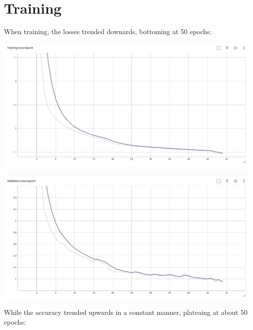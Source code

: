 \documentclass[conference]{IEEEtran}
\begin{document}
\section{Training}
When training, the losses trended downards, bottoming at 50 epochs:

\begin{center}
    \begin{minipage}{0.75\linewidth}
        \includegraphics[width=\linewidth]{images/training_loss_graph.png}
    \end{minipage}
\end{center}
\begin{center}
    \begin{minipage}{0.75\linewidth}
        \includegraphics[width=\linewidth]{images/validation_loss_graph.png}
    \end{minipage}
\end{center}

While the accuracy trended upwards in a constant manner, plateaing at about 50 epochs:
\end{document}
